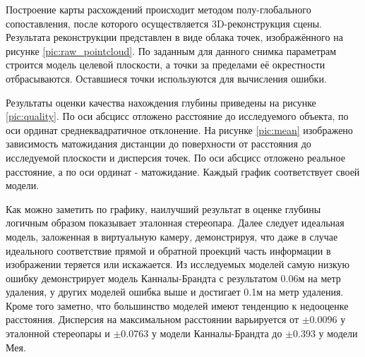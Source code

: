 
Построение карты расхождений происходит методом полу-глобального  сопоставления, после которого осуществляется 3D-реконструкция сцены. 
Результата реконструкции представлен  в виде облака точек,  изображённого на рисунке \ref{pic:raw_pointcloud}.
По заданным для данного снимка параметрам строится модель целевой плоскости, а точки за пределами её окрестности отбрасываются. %
Оставшиеся точки используются для вычисления ошибки. 
 

Результаты оценки качества нахождения глубины приведены на рисунке \ref{pic:quality}. По оси абсцисс отложено расстояние до исследуемого объекта,
по оси ординат среднеквадратичное отклонение. На рисунке \ref{pic:mean} изображено зависимость матожидания дистанции до поверхности от расстояния 
до исследуемой плоскости и дисперсия точек. По оси абсцисс отложено реальное расстояние, а по оси ординат - матожидание. Каждый график соответствует своей модели.



Как можно заметить по графику, наилучший результат в оценке глубины логичным образом показывает эталонная стереопара. Далее следует 
идеальная модель, заложенная в виртуальную камеру, демонстрируя, что даже в случае идеального соответствие прямой и обратной проекций часть 
информации в изображении теряется или искажается. Из исследуемых моделей самую низкую ошибку демонстрирует модель Канналы-Брандта с результатом
0.06м на метр удаления, у других моделей ошибка выше и достигает 0.1м на метр удаления. Кроме того заметно, что большинство моделей имеют тенденцию
к недооценке расстояния.  Дисперсия на максимальном расстоянии варьируется от $\pm 0.0096$ у эталонной стереопары и $\pm 0.0763$ у модели Канналы-Брандта 
до $\pm 0.393$ у модели Мея. 



